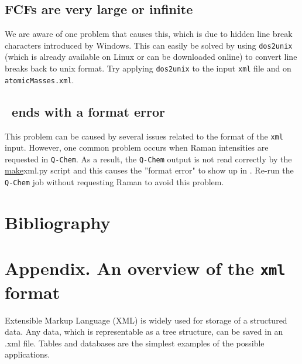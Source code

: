 \documentclass[11pt]{article}
\begin{document}
\subsection{FCFs are very large or infinite}
\label{sec:infinite}

We are aware of one problem that causes this, which is due to hidden line break characters introduced by Windows. 
This can easily be solved by using {\tt dos2unix} (which is already available on Linux or can be downloaded online) 
to convert line breaks back to unix format. Try applying {\tt dos2unix} to the input {\tt xml} file and on {\tt atomicMasses.xml}.


\subsection{\ezFCF\ ends with a format error}
\label{sec:formaterror}

This problem can be caused by several issues related to the format of the {\tt xml} input. However, one common problem 
occurs when Raman intensities are requested in {\tt Q-Chem}. As a result, the 
{\tt Q-Chem} output is not read correctly by the \ul{make}{xml.py} script and this causes the ''format error"
to show up in \ezFCF. Re-run the {\tt Q-Chem} job without requesting Raman to avoid this problem.

\clearpage
\section*{Bibliography}



\clearpage
\section*{Appendix. An overview of the \texttt{xml} format}
\label{sec:xmlformat}

Extensible Markup Language (XML) is widely used for storage of a structured data. 
Any data, which is representable as a tree structure, can be saved in an .xml file. 
Tables and databases are the simplest examples of the possible applications. 
\end{document}
